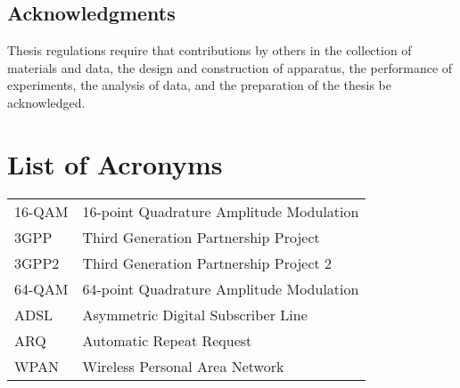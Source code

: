 \documentclass [12pt,letterpaper]{report}
\begin{document}
\newpage

\section*{\centering Acknowledgments}

Thesis regulations require that contributions by others in the collection of
 materials and data, the design and construction of apparatus, the performance
 of experiments, the analysis of data, and the preparation of the thesis be
 acknowledged.

\tableofcontents
\listoffigures
\listoftables

\newpage
\chapter*{List of Acronyms}

\begin{longtable}{ll}
  16-QAM   &  16-point Quadrature Amplitude Modulation\\
  3GPP     &  Third Generation Partnership Project\\
  3GPP2    &  Third Generation Partnership Project 2\\
  64-QAM   &  64-point Quadrature Amplitude Modulation\\
  ADSL     &  Asymmetric Digital Subscriber Line\\
  ARQ      &  Automatic Repeat Request\\
  WPAN     &  Wireless Personal Area Network
\end{longtable}

\cleardoublepage
{}

\typeout{}


\typeout{}


%

%


%

\typeout{}
\begin{singlespace}
  
  
\end{singlespace}
\end{document}
